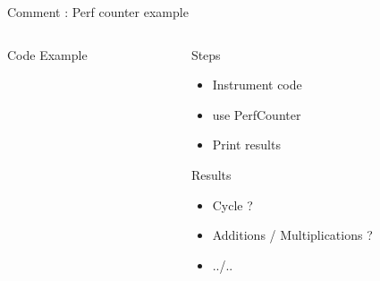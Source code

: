 \begin{frame}[fragile]{Comment : Perf counter example}

  \begin{columns}[t]
   \begin{column}{\BW}
     \begin{block}{Code Example}

     \end{block}
   \end{column}
   \begin{column}{\BW}
     \begin{block}{Steps}
       \begin{itemize}
       \item Instrument code
       \item use PerfCounter
       \item Print results
       \end{itemize}
     \end{block}
     \begin{block}{Results}
       \begin{itemize}
       \item Cycle ?
       \item Additions / Multiplications ?
       \item ../..
       \end{itemize}
     \end{block}
   \end{column}
  \end{columns}
\end{frame}
%

